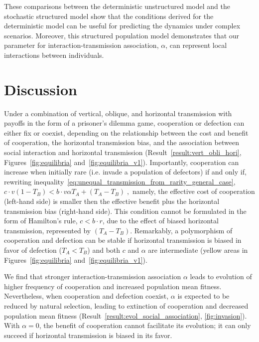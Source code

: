 \documentclass[12pt]{extarticle}
\begin{document}
These comparisons between the deterministic unstructured model and the stochastic structured model show that the conditions derived for the deterministic model can be useful for predicting the dynamics under complex scenarios. 
Moreover, this structured population model demonstrates that our parameter for interaction-transmission association, $\alpha$, can represent local interactions between individuals.


\section*{Discussion}
Under a combination of vertical, oblique, and horizontal transmission with payoffs in the form of a prisoner's dilemma game, cooperation or defection can either fix or coexist, depending on the relationship between the cost and benefit of cooperation, the horizontal transmission bias, and the association between social interaction and horizontal transmission (Result~\ref{result:vert_obli_hori}, Figures~\ref{fig:equilibria} and~\ref{fig:equilibria_v1}).
Importantly, cooperation can increase when initially rare (i.e. invade a population of defectors) if and only if, rewriting inequality~\ref{eq:unequal_transmission_from_rarity_general_case},
$
c \cdot v (1-T_B) < b \cdot v \alpha T_A + (T_A - T_B) \;,
$
namely, the effective cost of cooperation (left-hand side) is smaller then the effective benefit plus the horizontal transmission bias (right-hand side).
This condition cannot be formulated in the form of Hamilton's rule, $c<b \cdot r$, due to the effect of biased horizontal transmission, represented by $(T_A-T_B)$.
Remarkably, a polymorphism of cooperation and defection can be stable if horizontal transmission is biased in favor of defection ($T_A<T_B$) and both $c$ and $\alpha$ are intermediate (yellow areas in Figures~\ref{fig:equilibria} and~\ref{fig:equilibria_v1}).

We find that stronger interaction-transmission association $\alpha$ leads to evolution of higher frequency of cooperation and increased population mean fitness.
Nevertheless, when cooperation and defection coexist, $\alpha$ is expected to be reduced by natural selection, leading to extinction of cooperation and decreased population mean fitness (Result~\ref{result:evol_social_association}, \autoref{fig:invasion}).
With $\alpha=0$, the benefit of cooperation cannot facilitate its evolution; it can only succeed if horizontal transmission is biased in its favor. 
\end{document}
